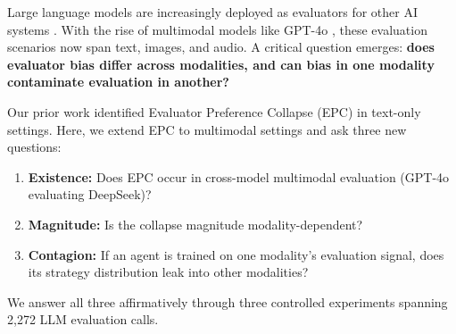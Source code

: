 \documentclass[11pt,a4paper]{article}
\begin{document}
Large language models are increasingly deployed as evaluators for other AI systems \cite{zheng2023judging, chiang2024chatbot}. With the rise of multimodal models like GPT-4o \cite{openai2024gpt4o}, these evaluation scenarios now span text, images, and audio. A critical question emerges: \textbf{does evaluator bias differ across modalities, and can bias in one modality contaminate evaluation in another?}

Our prior work identified Evaluator Preference Collapse (EPC) in text-only settings. Here, we extend EPC to multimodal settings and ask three new questions:

\begin{enumerate}[leftmargin=*]
    \item \textbf{Existence:} Does EPC occur in cross-model multimodal evaluation (GPT-4o evaluating DeepSeek)?
    \item \textbf{Magnitude:} Is the collapse magnitude modality-dependent?
    \item \textbf{Contagion:} If an agent is trained on one modality's evaluation signal, does its strategy distribution leak into other modalities?
\end{enumerate}

We answer all three affirmatively through three controlled experiments spanning 2,272 LLM evaluation calls.
\end{document}
